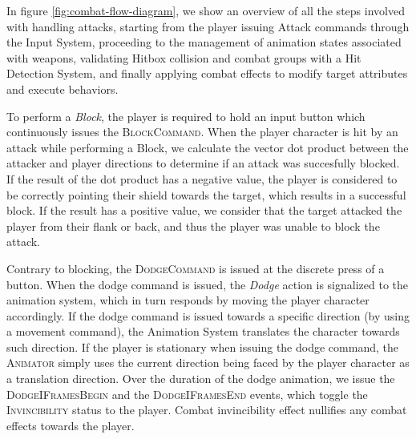 In figure \ref{fig:combat-flow-diagram}, we show an overview of all the steps involved with handling attacks, starting from the player issuing Attack commands through the Input System, proceeding to the management of animation states associated with weapons, validating Hitbox collision and combat groups with a Hit Detection System, and finally applying combat effects to modify target attributes and execute behaviors.



To perform a \emph{Block}, the player is required to hold an input button which continuously issues the \textsc{BlockCommand}. When the player character is hit by an attack while performing a Block, we calculate the vector dot product between the attacker and player directions to determine if an attack was succesfully blocked. If the result of the dot product has a negative value, the player is considered to be correctly pointing their shield towards the target, which results in a successful block. If the result has a positive value, we consider that the target attacked the player from their flank or back, and thus the player was unable to block the attack.

Contrary to blocking, the \textsc{DodgeCommand} is issued at the discrete press of a button. When the dodge command is issued, the \emph{Dodge} action is signalized to the animation system, which in turn responds by moving the player character accordingly. If the dodge command is issued towards a specific direction (by using a movement command), the Animation System translates the character towards such direction. If the player is stationary when issuing the dodge command, the \textsc{Animator} simply uses the current direction being faced by the player character as a translation direction. Over the duration of the dodge animation, we issue the \textsc{DodgeIFramesBegin} and the \textsc{DodgeIFramesEnd} events, which toggle the \textsc{Invincibility} status to the player. Combat invincibility effect nullifies any combat effects towards the player.


